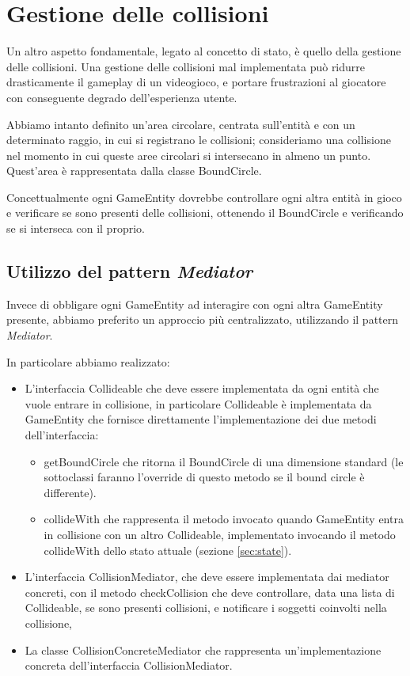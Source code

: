 \documentclass[a4paper,12pt]{article}
\begin{document}
\section{Gestione delle collisioni}
\label{sec:collisioni}

Un altro aspetto fondamentale, legato al concetto di stato, \`e quello della gestione delle collisioni. Una gestione delle collisioni mal implementata pu\`o ridurre drasticamente il gameplay di un videogioco, e portare frustrazioni al giocatore con conseguente degrado dell'esperienza utente.

Abbiamo intanto definito un'area circolare, centrata sull'entit\`a e con un determinato raggio, in cui si registrano le collisioni; consideriamo una collisione nel momento in cui queste aree circolari si intersecano in almeno un punto. Quest'area \`e rappresentata dalla classe \textsf{BoundCircle}.

Concettualmente ogni \textsf{GameEntity} dovrebbe controllare ogni altra entit\`a in gioco e verificare se sono presenti delle collisioni, ottenendo il \textsf{BoundCircle} e verificando se si interseca con il proprio.

\subsection{Utilizzo del pattern \emph{Mediator}}

Invece di obbligare ogni \textsf{GameEntity} ad interagire con ogni altra \textsf{GameEntity} presente, abbiamo preferito un approccio pi\`u centralizzato, utilizzando il pattern \emph{Mediator}.

In particolare abbiamo realizzato:
\begin{itemize}
\item L'interfaccia \textsf{Collideable} che deve essere implementata da ogni entit\`a che vuole entrare in collisione, in particolare \textsf{Collideable} \`e implementata da \textsf{GameEntity} che fornisce direttamente l'implementazione dei due metodi dell'interfaccia:
\begin{itemize}
\item \textsf{getBoundCircle} che ritorna il \textsf{BoundCircle} di una dimensione standard (le sottoclassi faranno l'override di questo metodo se il bound circle \`e differente).
\item \textsf{collideWith} che rappresenta il metodo invocato quando \textsf{GameEntity} entra in collisione con un altro \textsf{Collideable}, implementato invocando il metodo \textsf{collideWith} dello stato attuale (sezione \ref{sec:state}).
\end{itemize}
\item L'interfaccia \textsf{CollisionMediator}, che deve essere implementata dai mediator concreti, con il metodo \textsf{checkCollision} che deve controllare, data una lista di \textsf{Collideable}, se sono presenti collisioni, e notificare i soggetti coinvolti nella collisione,
\item La classe \textsf{CollisionConcreteMediator} che rappresenta un'implementazione concreta dell'interfaccia \textsf{CollisionMediator}.
\end{itemize}
\end{document}

